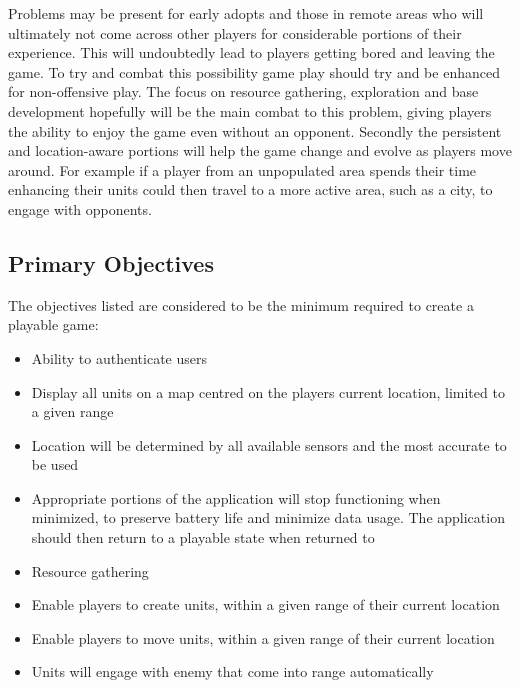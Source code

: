 Problems may be present for early adopts and those in remote areas who will ultimately not come across other players for considerable portions of their experience. This will undoubtedly lead to players getting bored and leaving the game. To try and combat this possibility game play should try and be enhanced for non-offensive play. The focus on resource gathering, exploration and base development hopefully will be the main combat to this problem, giving players the ability to enjoy the game even without an opponent. Secondly the persistent and location-aware portions will help the game change and evolve as players move around. For example if a player from an unpopulated area spends their time enhancing their units could then travel to a more active area, such as a city, to engage with opponents.

\subsection{Primary Objectives}
The objectives listed are considered to be the minimum required to create a playable game:
\begin{itemize}
\item Ability to authenticate users
\item Display all units on a map centred on the players current location, limited to a given range
\item Location will be determined by all available sensors and the most accurate to be used
\item Appropriate portions of the application will stop functioning when minimized, to preserve battery life and minimize data usage. The application should then return to a playable state when returned to
\item Resource gathering
\item Enable players to create units, within a given range of their current location
\item Enable players to move units, within a given range of their current location
\item Units will engage with enemy that come into range automatically
\end{itemize} 

